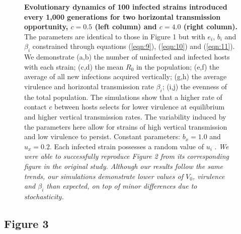 \begin{figure}[tbp]
    \medskip
    \hfil
\caption{\textbf{Evolutionary dynamics of 100 infected strains introduced every 1,000 generations for two horizontal transmission opportunity, $c = 0.5$ (left column) and $c = 4.0$ (right column).} The parameters are identical to those in Figure 1 but with $e_i$, $b_i$ and $\beta_i$ constrained through equations (\ref{eqn:9}), (\ref{eqn:10}) and (\ref{eqn:11}). We demonstrate (a,b) the number of uninfected and infected hosts with each strain; (c,d) the mean $R_0$ in the population; (e,f) the average of all new infections acquired vertically; (g,h) the average virulence and horizontal transmission rate $\beta_i$; (i,j) the evenness of the total population. The simulations show that a higher rate of contact $c$ between hosts selects for lower virulence at equilibrium and higher vertical transmission rates. The variability induced by the parameters here allow for strains of high vertical transmission and low virulence to persist. Constant parameters: $b_x = 1.0$ and $u_x = 0.2$. Each infected strain possesses a random value of $u_i$ \in [$u_x$, 1]. \textit{We were able to successfully reproduce Figure 2 from its corresponding figure in the original study. Although our results follow the same trends, our simulations demonstrate lower values of $V_0$, virulence and $\beta_i$ than expected, on top of minor differences due to stochasticity.}
}
    \label{fig:figure2}
\end{figure}

\subsection{Figure 3}

